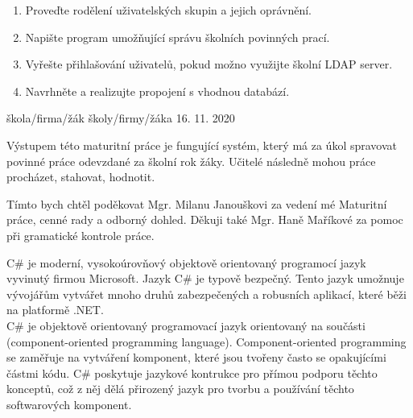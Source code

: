 \documentclass[a4paper, 12pt]{report}
\begin{document}
	
	\titulniStrana

	{
			\begin{enumerate}
				\item
				Proveďte rodělení uživatelských skupin a jejich oprávnění.
				\item
				Napište program umožňující správu školních povinných prací.
				\item
				Vyřešte přihlašování uživatelů, pokud možno využijte školní LDAP server.
				\item
				Navrhněte a realizujte propojení s vhodnou databází.
			\end{enumerate}
	}
	{škola/firma/žák}
	{školy/firmy/žáka}
	{16. 11. 2020}
	
	\anotace

	\annotation
	Výstupem této maturitní práce je fungující systém, který má za úkol spravovat povinné práce odevzdané za školní rok žáky. Učitelé následně mohou práce procházet, stahovat, hodnotit.


	\podekovani
	Tímto bych chtěl poděkovat Mgr. Milanu Janouškovi za vedení mé Maturitní práce, cenné rady a odborný dohled. Děkuji také Mgr. Haně Maříkové za pomoc při gramatické kontrole práce.
	
	
	\obsah
	
	C\# je moderní, vysokoúrovňový objektově orientovaný programocí jazyk vyvinutý firmou Microsoft. Jazyk C\# je typově bezpečný. Tento jazyk umožnuje vývojářům vytvářet mnoho druhů zabezpečených a robusních aplikací, které běži na platformě .NET.\\
	C\# je objektově orientovaný programovací jazyk orientovaný na součásti (component-oriented programming language). Component-oriented programming se zaměřuje na vytváření komponent, které jsou tvořeny často se opakujícími částmi kódu. C\# poskytuje jazykové kontrukce pro přímou podporu těchto konceptů, což z něj dělá přirozený jazyk pro tvorbu a používání těchto softwarových komponent.
\end{document}
